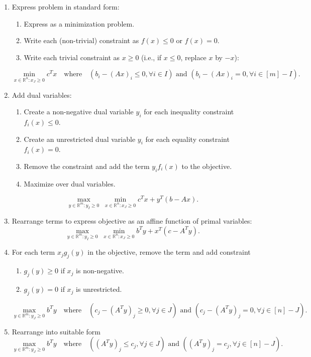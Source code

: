 \documentclass[a4paper,12pt,fleqn]{article}
\newenvironment*{tightenum}{\begin{enumerate}[noitemsep]}{\end{enumerate}}
\begin{document}
\begin{enumerate}
\item Express problem in standard form:
    \begin{tightenum}
    \item Express as a minimization problem.
    \item Write each (non-trivial) constraint as $f(x) \le 0$ or $f(x) = 0$.
    \item Write each trivial constraint as $x \ge 0$ (i.e., if $x \le 0$, replace $x$ by $-x$):
    \end{tightenum}
\[ \min_{x \in \mathbb{R}^n: x_J \ge 0} c^Tx \quad\textrm{where}\quad
(b_i - (Ax)_i \le 0, \forall i \in I) \textrm{ and } (b_i - (Ax)_i = 0, \forall i \in [m]-I). \]
\item Add dual variables:
    \begin{tightenum}
    \item Create a non-negative dual variable $y_i$ for each inequality constraint $f_i(x) \le 0$.
    \item Create an unrestricted dual variable $y_i$ for each equality constraint $f_i(x) = 0$.
    \item Remove the constraint and add the term $y_if_i(x)$ to the objective.
    \item Maximize over dual variables.
    \end{tightenum}
\[ \max_{y \in \mathbb{R}^m: y_I \ge 0}\; \min_{x \in \mathbb{R}^n: x_J \ge 0} c^Tx + y^T(b - Ax). \]
\item Rearrange terms to express objective as an affine function of primal variables:
\[ \max_{y \in \mathbb{R}^m: y_I \ge 0}\; \min_{x \in \mathbb{R}^n: x_J \ge 0} b^Ty + x^T(c - A^Ty). \]
\item For each term $x_jg_j(y)$ in the objective, remove the term and add constraint
    \begin{tightenum}
    \item $g_j(y) \ge 0$ if $x_j$ is non-negative.
    \item $g_j(y) = 0$ if $x_j$ is unrestricted.
    \end{tightenum}
\[ \max_{y \in \mathbb{R}^m: y_J \ge 0} b^Ty \quad\textrm{where}\quad
(c_j - (A^Ty)_j \ge 0, \forall j \in J) \textrm{ and } (c_j - (A^Ty)_j = 0, \forall j \in [n]-J). \]
\item Rearrange into suitable form
\[ \max_{y \in \mathbb{R}^m: y_J \ge 0} b^Ty \quad\textrm{where}\quad
((A^Ty)_j \le c_j, \forall j \in J) \textrm{ and } ((A^Ty)_j = c_j, \forall j \in [n]-J). \]
\end{enumerate}
\end{document}
